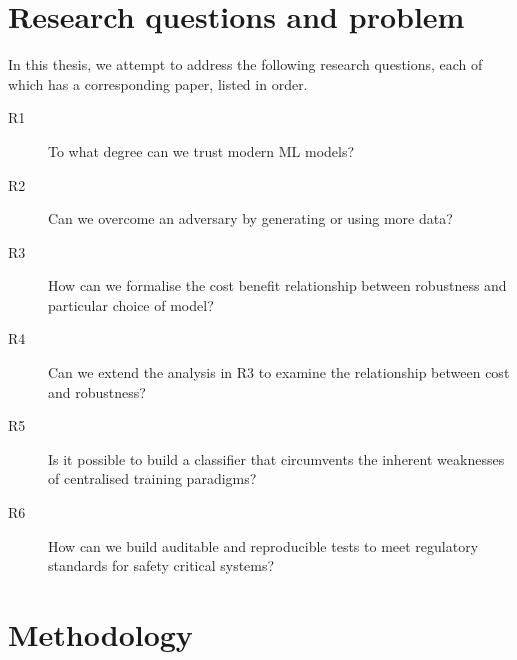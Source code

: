 \newpage
\section{Research questions and problem}
\label{sec:research-questions-and-problems}
In this thesis, we attempt to address the following research questions, each of which has a corresponding paper, listed in order.
\begin{description}
    \item[R1] To what degree can we trust modern ML models? 
    \item[R2] Can we overcome an adversary by generating or using more data?
    \item[R3] How can we formalise the cost benefit relationship between robustness and particular choice of model?
    \item[R4] Can we extend the analysis in R3 to examine the relationship between cost and robustness?
    \item[R5] Is it possible to build a classifier that circumvents the inherent weaknesses of centralised training paradigms?
    \item[R6] How can we build auditable and reproducible tests to meet regulatory standards for safety critical systems?
    
\end{description}

\section{Methodology}
\label{sec:methods}

